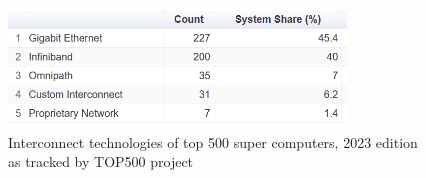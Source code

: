 

\begin{figure}[H]
	\centering
	\includegraphics[width=0.8\textwidth]{resources/images/Interconnect_Technologies_500_supercomp.PNG}
	\caption{Interconnect technologies of top 500 super computers, 2023 edition as tracked by TOP500 project \cite{Interconnect_Technologies_500_supercomp}}
    \label{fig:introduction:Interconnect_Technologies_500_supercomp}
\end{figure}





